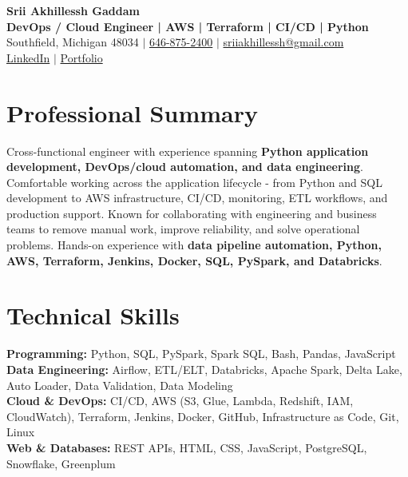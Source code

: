 \documentclass[letterpaper,10pt]{article}
\begin{document}
\fontsize{9.35pt}{10.45pt}\selectfont

\begin{center}
    {\LARGE \textbf{Srii Akhillessh Gaddam}} \\[-1pt]
    \textbf{DevOps / Cloud Engineer | AWS | Terraform | CI/CD | Python} \\[2pt]
    Southfield, Michigan 48034 $|$
    \href{tel:6468752400}{646-875-2400} $|$
    \href{mailto:sriiakhillessh@gmail.com}{sriiakhillessh@gmail.com} \\[1pt]
    \href{https://www.linkedin.com/in/srii-akhiilessh-gaddam-b48668191/}{LinkedIn} $|$
    \href{https://sriiakhillesshg.github.io/portfolio/}{Portfolio}
\end{center}
\vspace{-8pt}

\section{Professional Summary}
\small{Cross-functional engineer with experience spanning \textbf{Python application development, DevOps/cloud automation, and data engineering}. Comfortable working across the application lifecycle - from Python and SQL development to AWS infrastructure, CI/CD, monitoring, ETL workflows, and production support. Known for collaborating with engineering and business teams to remove manual work, improve reliability, and solve operational problems. Hands-on experience with \textbf{data pipeline automation, Python, AWS, Terraform, Jenkins, Docker, SQL, PySpark, and Databricks}.}

\section{Technical Skills}
\small{
\textbf{Programming:} Python, SQL, PySpark, Spark SQL, Bash, Pandas, JavaScript \\
\textbf{Data Engineering:} Airflow, ETL/ELT, Databricks, Apache Spark, Delta Lake, Auto Loader, Data Validation, Data Modeling \\
\textbf{Cloud \& DevOps:} CI/CD, AWS (S3, Glue, Lambda, Redshift, IAM, CloudWatch), Terraform, Jenkins, Docker, GitHub, Infrastructure as Code, Git, Linux \\
\textbf{Web \& Databases:} REST APIs, HTML, CSS, JavaScript, PostgreSQL, Snowflake, Greenplum
}
\end{document}
